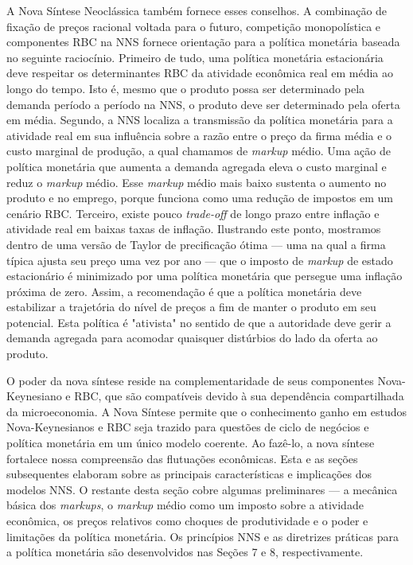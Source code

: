 \documentclass[12pt]{article}
\begin{document}
A Nova Síntese Neoclássica também fornece esses conselhos. A combinação de fixação de preços racional voltada para o futuro, competição monopolística e componentes RBC na NNS fornece orientação para a política monetária baseada no seguinte raciocínio. Primeiro de tudo, uma política monetária estacionária deve respeitar os determinantes RBC da atividade econômica real em média ao longo do tempo. Isto é, mesmo que o produto possa ser determinado pela demanda período a período na NNS, o produto deve ser determinado pela oferta em média. Segundo, a NNS localiza a transmissão da política monetária para a atividade real em sua influência sobre a razão entre o preço da firma média e o custo marginal de produção, a qual chamamos de \textit{markup} médio. Uma ação de política monetária que aumenta a demanda agregada eleva o custo marginal e reduz o \textit{markup} médio. Esse \textit{markup} médio mais baixo sustenta o aumento no produto e no emprego, porque funciona como uma redução de impostos em um cenário RBC. Terceiro, existe pouco \textit{trade-off} de longo prazo entre inflação e atividade real em baixas taxas de inflação. Ilustrando este ponto, mostramos dentro de uma versão de Taylor de precificação ótima — uma na qual a firma típica ajusta seu preço uma vez por ano — que o imposto de \textit{markup} de estado estacionário é minimizado por uma política monetária que persegue uma inflação próxima de zero. Assim, a recomendação é que a política monetária deve estabilizar a trajetória do nível de preços a fim de manter o produto em seu potencial. Esta política é "ativista" no sentido de que a autoridade deve gerir a demanda agregada para acomodar quaisquer distúrbios do lado da oferta ao produto.

O poder da nova síntese reside na complementaridade de seus componentes Nova-Keynesiano e RBC, que são compatíveis devido à sua dependência compartilhada da microeconomia. A Nova Síntese permite que o conhecimento ganho em estudos Nova-Keynesianos e RBC seja trazido para questões de ciclo de negócios e política monetária em um único modelo coerente. Ao fazê-lo, a nova síntese fortalece nossa compreensão das flutuações econômicas. Esta e as seções subsequentes elaboram sobre as principais características e implicações dos modelos NNS. O restante desta seção cobre algumas preliminares — a mecânica básica dos \textit{markups}, o \textit{markup} médio como um imposto sobre a atividade econômica, os preços relativos como choques de produtividade e o poder e limitações da política monetária. Os princípios NNS e as diretrizes práticas para a política monetária são desenvolvidos nas Seções 7 e 8, respectivamente.
\end{document}
